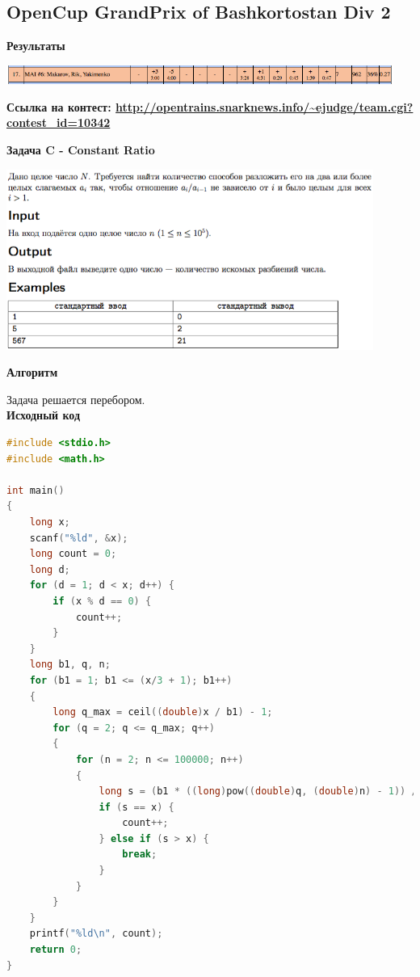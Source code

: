 \documentclass[a4paper,12pt]{article}
\begin{document}
%
%
\newpage
\subsection{OpenCup GrandPrix of Bashkortostan Div 2}

\textbf{{\large Результаты}} \\
\begin{center}
\includegraphics[width=0.95\textwidth]{OC_Bashkortostan/result.png}\\ [1cm]
\end{center}

\textbf{{\large Ссылка на контест: \url{http://opentrains.snarknews.info/~ejudge/team.cgi?contest_id=10342}}}

\newpage
\textbf{{\large Задача C - Constant Ratio}}

\begin{center}
\includegraphics[width=0.9\textwidth]{OC_Bashkortostan/C.png}\\ [1cm]
\end{center}

\textbf{{\large Алгоритм}}

Задача решается перебором. \\

\textbf{{\large Исходный код}} \\
\begin{lstlisting}[language=C++]
#include <stdio.h>
#include <math.h>

int main()
{
    long x;
    scanf("%ld", &x); 
    long count = 0; 
    long d;
    for (d = 1; d < x; d++) {
        if (x % d == 0) {
            count++;
        }
    } 
    long b1, q, n;
    for (b1 = 1; b1 <= (x/3 + 1); b1++)
    {
        long q_max = ceil((double)x / b1) - 1;     
        for (q = 2; q <= q_max; q++)
        {
            for (n = 2; n <= 100000; n++)
            {
                long s = (b1 * ((long)pow((double)q, (double)n) - 1)) / (q - 1);
                if (s == x) {
                    count++;
                } else if (s > x) {
                    break;
                }
            }
        }
    }   
    printf("%ld\n", count);  
    return 0;
}
\end{lstlisting}
\end{document}
